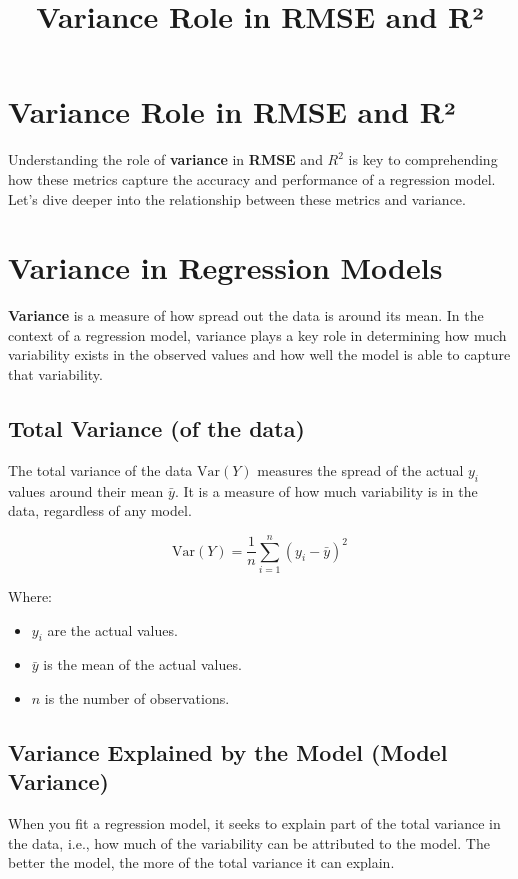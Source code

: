 \documentclass{article}
\title{Variance Role in RMSE and R²}
\author{}
\date{}
\begin{document}
\maketitle

\section{Variance Role in RMSE and R²}
Understanding the role of \textbf{variance} in \textbf{RMSE} and \( R^2 \) is key to comprehending how these metrics capture the accuracy and performance of a regression model. Let's dive deeper into the relationship between these metrics and variance.

\section{Variance in Regression Models}
\textbf{Variance} is a measure of how spread out the data is around its mean. In the context of a regression model, variance plays a key role in determining how much variability exists in the observed values and how well the model is able to capture that variability.

\subsection{Total Variance (of the data)}
The total variance of the data \( \text{Var}(Y) \) measures the spread of the actual \( y_i \) values around their mean \( \bar{y} \). It is a measure of how much variability is in the data, regardless of any model.

\[
\text{Var}(Y) = \frac{1}{n} \sum_{i=1}^{n} (y_i - \bar{y})^2
\]

Where:
\begin{itemize}
    \item \( y_i \) are the actual values.
    \item \( \bar{y} \) is the mean of the actual values.
    \item \( n \) is the number of observations.
\end{itemize}

\subsection{Variance Explained by the Model (Model Variance)}
When you fit a regression model, it seeks to explain part of the total variance in the data, i.e., how much of the variability can be attributed to the model. The better the model, the more of the total variance it can explain.
\end{document}
